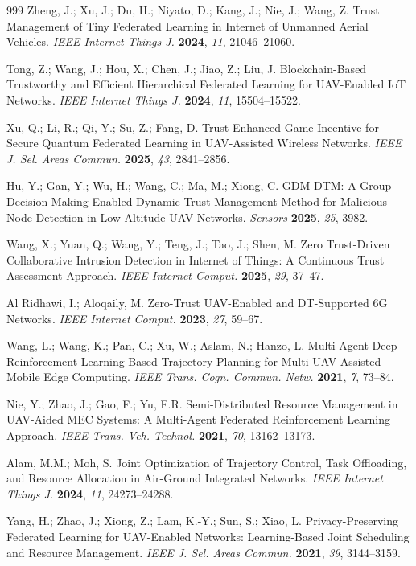 \documentclass[notspecified,article,submit,moreauthors]{Definitions/mdpi}
\begin{document}
\begin{thebibliography}{999}
Zheng, J.; Xu, J.; Du, H.; Niyato, D.; Kang, J.; Nie, J.; Wang, Z. Trust Management of Tiny Federated Learning in Internet of Unmanned Aerial Vehicles. {\em IEEE Internet Things J.} {\bf 2024}, {\em 11}, 21046--21060.

Tong, Z.; Wang, J.; Hou, X.; Chen, J.; Jiao, Z.; Liu, J. Blockchain-Based Trustworthy and Efficient Hierarchical Federated Learning for UAV-Enabled IoT Networks. {\em IEEE Internet Things J.} {\bf 2024}, {\em 11}, 15504--15522.

Xu, Q.; Li, R.; Qi, Y.; Su, Z.; Fang, D. Trust-Enhanced Game Incentive for Secure Quantum Federated Learning in UAV-Assisted Wireless Networks. {\em IEEE J. Sel. Areas Commun.} {\bf 2025}, {\em 43}, 2841--2856.

Hu, Y.; Gan, Y.; Wu, H.; Wang, C.; Ma, M.; Xiong, C. GDM-DTM: A Group Decision-Making-Enabled Dynamic Trust Management Method for Malicious Node Detection in Low-Altitude UAV Networks. {\em Sensors} {\bf 2025}, {\em 25}, 3982.

Wang, X.; Yuan, Q.; Wang, Y.; Teng, J.; Tao, J.; Shen, M. Zero Trust-Driven Collaborative Intrusion Detection in Internet of Things: A Continuous Trust Assessment Approach. {\em IEEE Internet Comput.} {\bf 2025}, {\em 29}, 37--47.

Al Ridhawi, I.; Aloqaily, M. Zero-Trust UAV-Enabled and DT-Supported 6G Networks. {\em IEEE Internet Comput.} {\bf 2023}, {\em 27}, 59--67.

Wang, L.; Wang, K.; Pan, C.; Xu, W.; Aslam, N.; Hanzo, L. Multi-Agent Deep Reinforcement Learning Based Trajectory Planning for Multi-UAV Assisted Mobile Edge Computing. {\em IEEE Trans. Cogn. Commun. Netw.} {\bf 2021}, {\em 7}, 73--84.

Nie, Y.; Zhao, J.; Gao, F.; Yu, F.R. Semi-Distributed Resource Management in UAV-Aided MEC Systems: A Multi-Agent Federated Reinforcement Learning Approach. {\em IEEE Trans. Veh. Technol.} {\bf 2021}, {\em 70}, 13162--13173.

Alam, M.M.; Moh, S. Joint Optimization of Trajectory Control, Task Offloading, and Resource Allocation in Air-Ground Integrated Networks. {\em IEEE Internet Things J.} {\bf 2024}, {\em 11}, 24273--24288.

Yang, H.; Zhao, J.; Xiong, Z.; Lam, K.-Y.; Sun, S.; Xiao, L. Privacy-Preserving Federated Learning for UAV-Enabled Networks: Learning-Based Joint Scheduling and Resource Management. {\em IEEE J. Sel. Areas Commun.} {\bf 2021}, {\em 39}, 3144--3159.


\end{thebibliography}
\end{document}
